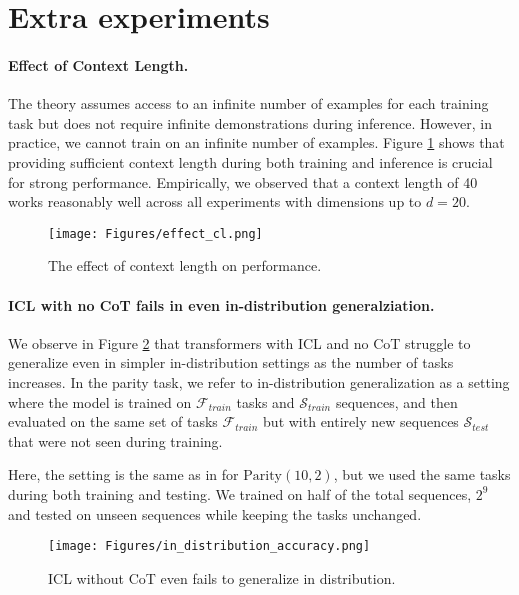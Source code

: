\section{Extra experiments}\label{appendix:extra_exps}


\paragraph{Effect of Context Length.} The theory assumes access to an infinite number of examples for each training task but does not require infinite demonstrations during inference. However, in practice, we cannot train on an infinite number of examples. Figure \ref{fig:cl_effect} shows that providing sufficient context length during both training and inference is crucial for strong performance. Empirically, we observed that a context length of 40 works reasonably well across all experiments with dimensions up to $d = 20$.

\begin{figure}[h!] 
    \centering
    \texttt{[image: Figures/effect\_cl.png]}
    \caption{The effect of context length on performance.}
    \label{fig:cl_effect}
\end{figure}

\paragraph{ ICL with no CoT fails in even in-distribution generalziation.} We observe in Figure \ref{fig:in_distribution_effect} that transformers with ICL and no CoT struggle to generalize even in simpler in-distribution settings as the number of tasks increases. In the parity task, we refer to in-distribution generalization as a setting where the model is trained on $\mathcal{F}_{train}$ tasks and $\mathcal{S}_{train}$ sequences, and then evaluated on the same set of tasks $\mathcal{F}_{train}$ but with entirely new sequences $\mathcal{S}_{test}$ that were not seen during training.

Here, the setting is the same as in \cite{bhattamishra2024understanding} for \( \text{Parity}(10,2) \), but we used the same tasks during both training and testing. We trained on half of the total sequences, $2^9$ and tested on unseen sequences while keeping the tasks unchanged.



\begin{figure}[h!] 
    \centering
    \texttt{[image: Figures/in\_distribution\_accuracy.png]}
    \caption{ICL without CoT even fails to generalize in distribution.}
    \label{fig:in_distribution_effect}
\end{figure}




